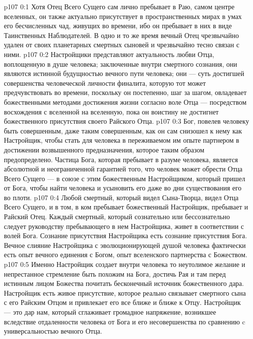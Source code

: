 \author{Одиночный Вестник}
\vs p107 0:1 Хотя Отец Всего Сущего сам лично пребывает в Раю, самом центре вселенных, он также актуально присутствует в пространственных мирах в умах его бесчисленных чад, живущих во времени, ибо он пребывает в них в виде Таинственных Наблюдателей. В одно и то же время вечный Отец чрезвычайно удален от своих планетарных смертных сыновей и чрезвычайно тесно связан с ними.
\vs p107 0:2 Настройщики представляют актуальность любви Отца, воплощенную в душе человека; заключенные внутри смертного сознания, они являются истинной будущностью вечного пути человека; они --- суть достигшей совершенства человеческой личности финалита, которую тот может предчувствовать во времени, поскольку он постепенно, шаг за шагом, овладевает божественными методами достижения жизни согласно воле Отца --- посредством восхождения с вселенной на вселенную, пока он воистину не достигнет божественного присутствия своего Райского Отца.
\vs p107 0:3 Бог, повелев человеку быть совершенным, даже таким совершенным, как он сам снизошел к нему как Настройщик, чтобы стать для человека в переживаемом им опыте партнером в достижении возвышенного предназначения, которое таким образом предопределено. Частица Бога, которая пребывает в разуме человека, является абсолютной и неограниченной гарантией того, что человек может обрести Отца Всего Сущего --- в союзе с этим божественным Настройщиком, который пришел от Бога, чтобы найти человека и усыновить его даже во дни существования его во плоти.
\vs p107 0:4 Любой смертный, который видел Сына\hyp{}Творца, видел Отца Всего Сущего, и в том, в ком пребывает божественный Настройщик, пребывает и Райский Отец. Каждый смертный, который сознательно или бессознательно следует руководству пребывающего в нем Настройщика, живет в соответствии с волей Бога. Сознание присутствия Настройщика есть сознание присутствия Бога. Вечное слияние Настройщика с эволюционирующей душой человека фактически есть опыт вечного единения с Богом, опыт вселенского партнерства с Божеством.
\vs p107 0:5 Именно Настройщик создает внутри человека то неутолимое желание и непрестанное стремление быть похожим на Бога, достичь Рая и там перед истинным лицом Божества почитать бесконечный источник божественного дара. Настройщик есть живое присутствие, которое реально связывает смертного сына с его Райским Отцом и привлекает его все ближе и ближе к Отцу. Настройщик --- это дар нам, который сглаживает громадное напряжение, возникшее вследствие отдаленности человека от Бога и его несовершенства по сравнению c универсальностью вечного Отца.
